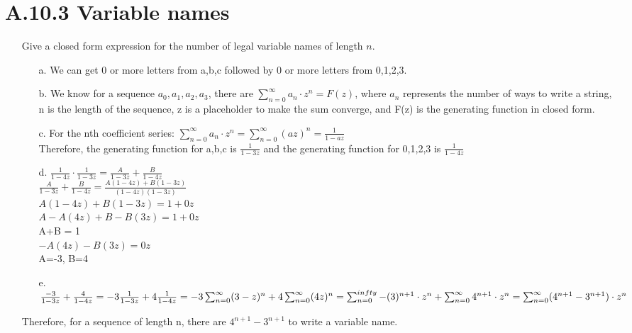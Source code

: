 \documentclass[12pt]{article}
\begin{document}
\section*{A.10.3 Variable names}
\begin{enumerate}
  \item[] Give a closed form expression for the number of legal variable names of length $n$.
    \begin{enumerate}
      \item[a.] We can get 0 or more letters from {a,b,c} followed by 0 or more letters from {0,1,2,3}.
      \item[b.] We know for a sequence $a_0,a_1,a_2,a_3$, there are $\sum_{n=0}^{\infty}a_n\cdot z^n = F(z)$,
        where $a_n$ represents the number of ways to write a string, n is the length of the sequence, z is a placeholder to make the sum converge, and F(z) is the generating function in closed form.
      \item[c.] For the nth coefficient series: $\sum_{n=0}^{\infty}a_n\cdot z^n = \sum_{n=0}^{\infty}(az)^n = \frac{1}{1-az}$
        \\ Therefore, the generating function for {a,b,c} is $\frac{1}{1-3z}$ and the generating function for {0,1,2,3} is $\frac{1}{1-4z}$
      \item[d.] $\frac{1}{1-4z}\cdot\frac{1}{1-3z} = \frac{A}{1-3z}+\frac{B}{1-4z}$
        \\ $\frac{A}{1-3z}+\frac{B}{1-4z} = \frac{A(1-4z)+B(1-3z)}{(1-4z)(1-3z)}$
        \\ $A(1-4z)+B(1-3z) = 1 + 0z$ 
        \\ $A - A(4z) + B - B(3z) = 1 + 0z$
        \\ A+B = 1
        \\ $-A(4z) - B(3z) = 0z$
        \\ A=-3, B=4
      \item[e.] $\frac{-3}{1-3z}+\frac{4}{1-4z} = -3\frac{1}{1-3z}+4\frac{1}{1-4z} 
        \\ = -3\sum_{n=0}^{\infty}(3-z)^n + 4\sum_{n=0}^{\infty}(4z)^n
        \\ = \sum_{n=0}^{infty}-(3)^{n+1}\cdot z^n + \sum_{n=0}^{\infty} 4^{n+1}\cdot z^n
        \\ = \sum_{n=0}^{\infty}(4^{n+1}-3^{n+1})\cdot z^n$
    \end{enumerate}
    Therefore, for a sequence of length n, there are $4^{n+1} - 3^{n+1}$ to write a variable name.
\end{enumerate}
\end{document}
